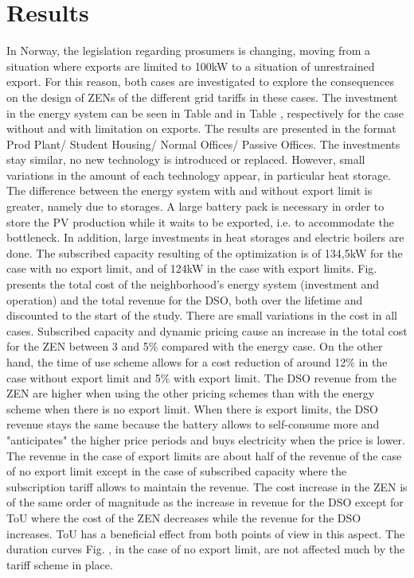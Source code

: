 \documentclass[conference]{IEEEtran}
\begin{document}
\section{Results}
In Norway, the legislation regarding prosumers is changing, moving from a situation where exports are limited to 100kW to a situation of unrestrained export. For this reason, both cases are investigated to explore the consequences on the design of ZENs of the different grid tariffs in these cases.
The investment in the energy system can be seen in Table  and in Table , respectively for the case without and with limitation on exports. The results are presented in the format Prod Plant/ Student Housing/ Normal Offices/ Passive Offices.
The investments stay similar, no new technology is introduced or replaced. However, small variations in the amount of each technology appear, in particular heat storage. The difference between the energy system with and without export limit is greater, namely due to storages. A large battery pack is necessary in order to store the PV production while it waits to be exported, i.e. to accommodate the bottleneck. In addition, large investments in heat storages and electric boilers are done.
The subscribed capacity resulting of the optimization is of 134,5kW for the case with no export limit, and of 124kW in the case with export limits.
Fig.  presents the total cost of the neighborhood's energy system (investment and operation) and the total revenue for the DSO, both over the lifetime and discounted to the start of the study. 
There are small variations in the cost in all cases. Subscribed capacity and dynamic pricing cause an increase in the total cost for the ZEN between 3 and 5\% compared with the energy case. On the other hand, the time of use scheme allows for a cost reduction of around 12\% in the case without export limit and 5\% with export limit.
The DSO revenue from the ZEN are higher when using the other pricing schemes than with the energy scheme when there is no export limit. When there is export limits, the DSO revenue stays the same because the battery allows to self-consume more and "anticipates" the higher price periods and buys electricity when the price is lower. The revenue in the case of export limits are about half of the revenue of the case of no export limit except in the case of subscribed capacity where the subscription tariff allows to maintain the revenue. 
The cost increase in the ZEN is of the same order of magnitude as the increase in revenue for the DSO except for ToU where the cost of the ZEN decreases while the revenue for the DSO increases. ToU has a beneficial effect from both points  of view in this aspect.
The duration curves Fig. , in the case of no export limit, are not affected much by the tariff scheme in place. 
\end{document}
